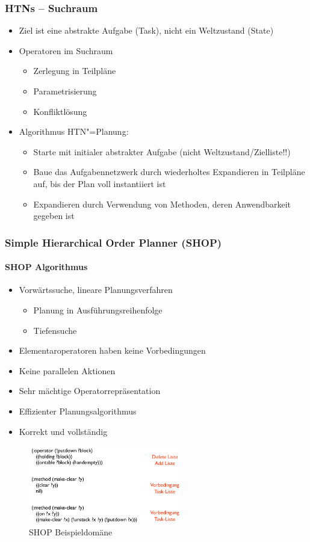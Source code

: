 \subsubsection{HTNs -- Suchraum}
\begin{itemize}
	\item Ziel ist eine abstrakte Aufgabe (Task), nicht ein Weltzustand (State)
	\item Operatoren im Suchraum
	\begin{itemize}
		\item Zerlegung in Teilpläne
		\item Parametrisierung
		\item Konfliktlösung
	\end{itemize}
	\item Algorithmus HTN"=Planung:
	\begin{itemize}
		\item Starte mit initialer abstrakter Aufgabe (nicht Weltzustand/Zielliste!!)
		\item Baue das Aufgabennetzwerk durch wiederholtes Expandieren in Teilpläne auf, bis der Plan voll instantiiert ist
		\item Expandieren durch Verwendung von Methoden, deren Anwendbarkeit gegeben ist
	\end{itemize}
\end{itemize}

\subsubsection{Simple Hierarchical Order Planner (SHOP)}
\paragraph{SHOP Algorithmus}
\begin{itemize}
	\item Vorwärtssuche, lineare Planungsverfahren
	\begin{itemize}
		\item Planung in Ausführungsreihenfolge
		\item Tiefensuche
	\end{itemize}
	\item Elementaroperatoren haben keine Vorbedingungen
	\item Keine parallelen Aktionen
	\item Sehr mächtige Operatorrepräsentation
	\item Effizienter Planungsalgorithmus
	\item Korrekt und vollständig
\end{itemize}
\begin{figure}[!h]
	\centering 
	\includegraphics[width=0.6\textwidth]{figures/ch06_shop.png}
	\caption{SHOP Beispieldomäne}
	\label{ch06_shop}
\end{figure}
